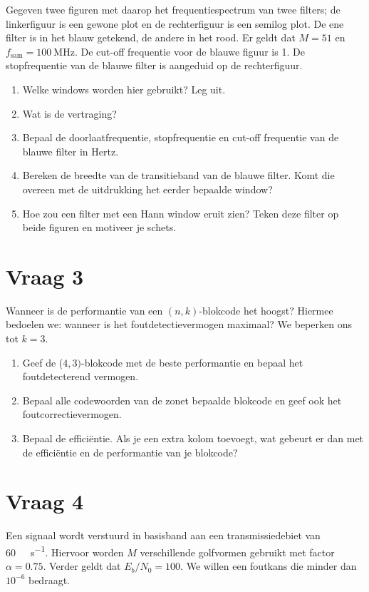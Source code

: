 \documentclass{kuburgiearticle}
\begin{document}
	Gegeven twee figuren met daarop het frequentiespectrum van twee filters; de linkerfiguur is een gewone plot en de rechterfiguur is een semilog plot. De ene filter is in het blauw getekend, de andere in het rood. Er geldt dat \(M=51\) en \(f_\text{sam}=\SI{100}{\mega\hertz}\). De cut-off frequentie voor de blauwe figuur is 1. De stopfrequentie van de blauwe filter is aangeduid op de rechterfiguur.

	\begin{enumerate}
		\item Welke windows worden hier gebruikt? Leg uit.
		\item Wat is de vertraging?
		\item Bepaal de doorlaatfrequentie, stopfrequentie en cut-off frequentie van de blauwe filter in Hertz.
		\item Bereken de breedte van de transitieband van de blauwe filter. Komt die overeen met de uitdrukking het eerder bepaalde window?
		\item Hoe zou een filter met een Hann window eruit zien? Teken deze filter op beide figuren en motiveer je schets.
	\end{enumerate}

	\section*{Vraag 3}

	Wanneer is de performantie van een \((n,k)\)-blokcode het hoogst? Hiermee bedoelen we: wanneer is het foutdetectievermogen maximaal? We beperken ons tot \(k=3\).

	\begin{enumerate}
		\item Geef de (\(4,3)\)-blokcode met de beste performantie en bepaal het foutdetecterend vermogen.
		\item Bepaal alle codewoorden van de zonet bepaalde blokcode en geef ook het foutcorrectievermogen.
		\item Bepaal de efficiëntie. Als je een extra kolom toevoegt, wat gebeurt er dan met de efficiëntie en de performantie van je blokcode?
	\end{enumerate}

	\section*{Vraag 4}

	Een signaal wordt verstuurd in basisband aan een transmissiedebiet van \SI{60}{\kilo\bit\per\second}. Hiervoor worden \(M\) verschillende golfvormen gebruikt met factor \(\alpha = 0.75\). Verder geldt dat \(E_b/N_0=100\). We willen een foutkans die minder dan \(10^{-6}\) bedraagt.
\end{document}
